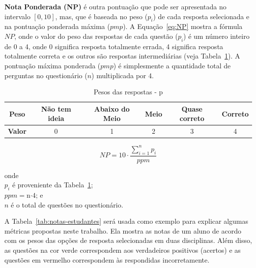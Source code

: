 \textbf{Nota Ponderada (NP)} é outra pontuação que pode ser apresentada no intervalo $[0,10]$, mas, que é baseada no peso ($p_i$) de cada resposta selecionada e na pontuação ponderada máxima ($pmp$). A Equação~\ref{eq:NP} mostra a fórmula $NP$, onde o valor do peso das respostas de cada questão ($p_i$) é um número inteiro de 0 a 4, onde 0 significa resposta totalmente errada, 4 significa resposta totalmente correta e os outros são respostas intermediárias (veja Tabela~\ref{tab:Pesos}).
A pontuação máxima ponderada ($pmp$) é simplesmente a quantidade total de perguntas no questionário ($n$) multiplicada por 4.

\begin{table}[htbp]
\caption{Pesos das respostas - p}
\centering
\begin{tabular}{|c|c|c|c|c|c|}
\hline
\textbf{Peso} & \textbf{Não tem ideia} & \textbf{Abaixo do Meio} & \textbf{Meio} & \textbf{Quase correto} & \textbf{Correto} \\ \hline
\textbf{Valor} & 0 & 1 & 2 & 3 & 4 \\ \hline
\end{tabular}
\label{tab:Pesos}
\end{table}

\begin{equation}
\label{eq:NP}
NP = 10 \cdot \frac{\sum_{i=1}^n p_i}{ppm}
\end{equation}

onde\\
\indent $p_i$ é proveniente da Tabela~\ref{tab:Pesos};\\
$ppm = $n$ \cdot 4$; e\\
$n$ é o total de questões no questionário.

A Tabela~\ref{tab:notas-estudantes} será usada como exemplo para explicar algumas métricas propostas neste trabalho. Ela mostra as notas de um aluno de acordo com os pesos das opções de resposta selecionadas em duas disciplinas. Além disso, as questões na cor verde correspondem aos verdadeiros positivos (acertos) e as questões em vermelho correspondem às respondidas incorretamente.

